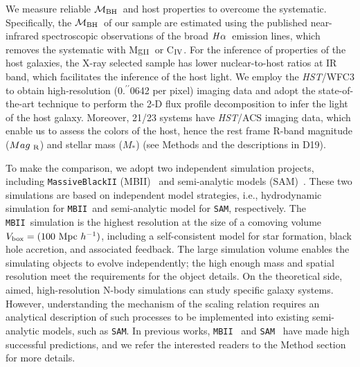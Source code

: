 \documentclass{natureprintstyle}
\newcommand{\hst}{{\it HST}}
\newcommand{\mbh}{$\mathcal M_{\rm BH}$}
\newcommand{\mr}{$Mag_{\rm ~R}$}
\newcommand{\halpha}{${\it H}\alpha$}
\newcommand{\mstar}{{$M_*$}}
\newcommand{\Mgii}{Mg$_{\rm II}$}
\newcommand{\Civ}{C$_{\rm IV}$}
\newcommand{\farcs}{\mbox{\ensuremath{.\!\!^{\prime\prime}}}}%
\newcommand{\sam}{\texttt{SAM}}
\newcommand{\mbii}{\texttt{MBII}}
\newcommand{\ding}[1]{\textcolor{red}{[{\bf Xuheng}: #1]}}
\begin{document}
We measure reliable \mbh\ and host properties to overcome the systematic. Specifically, the \mbh\ of our sample are estimated using the published near-infrared spectroscopic observations of the broad \halpha\ emission lines, which removes the systematic with \Mgii\ or \Civ. For the inference of properties of the host galaxies, the X-ray selected sample has lower nuclear-to-host ratios at IR band, which facilitates the inference of the host light. We employ the \hst/WFC3 to obtain high-resolution (0\farcs0642 per pixel) imaging data and adopt the state-of-the-art technique to perform the 2-D flux profile decomposition to infer the light of the host galaxy. Moreover, 21/23 systems have \hst/ACS imaging data, which enable us to assess the colors of the host, hence the rest frame R-band magnitude (\mr) and stellar mass (\mstar) (see Methods and the descriptions in D19). 


To make the comparison, we adopt two independent simulation projects, including \texttt{MassiveBlackII} (MBII)~\cite{Khandai2015} and semi-analytic models (SAM)~\cite{Menci2014}. These two simulations are based on independent model strategies, i.e., hydrodynamic simulation for \mbii\ and semi-analytic model for \sam, respectively. The \mbii\ simulation is the highest resolution at the size of a comoving volume $V_{\rm box} = (100~{\rm Mpc}~h^{-1})$, including a self-consistent model for star formation, black hole accretion, and associated feedback. The large simulation volume enables the simulating objects to evolve independently; the high enough mass and spatial resolution meet the requirements for the object details. On the theoretical side, aimed, high-resolution N-body simulations can study specific galaxy systems. However, understanding the mechanism of the scaling relation requires an analytical description of such processes to be implemented into existing semi-analytic models, such as \sam. In previous works, \mbii~\cite{Huang2018, DeG++15, Khandai2015,Bhowmick2019} and \sam~\cite{Menci2014, Menci2016} have made high successful predictions, and we refer the interested readers to the Method section for more details.
\end{document}
